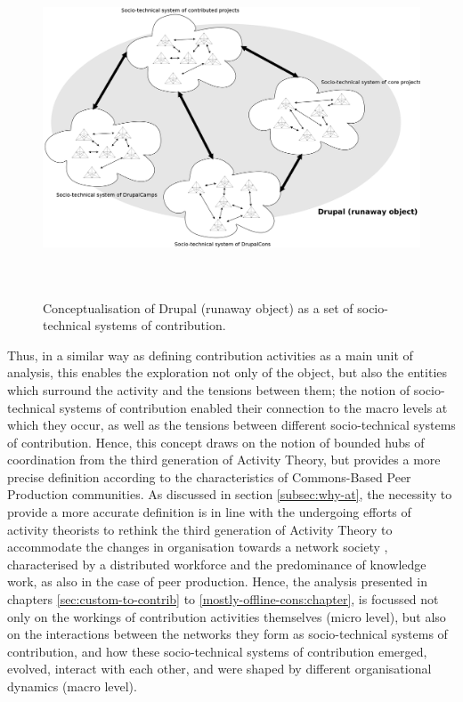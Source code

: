 \begin{figure}[h]
	\centering
	\includegraphics[height=10cm]{diagrams/STSoC.png}
	\caption[Conceptualisation of Drupal as a set of socio-technical systems of contribution]{Conceptualisation of Drupal (runaway object) as a set of socio-technical systems of contribution.}
	\label{STSoC}
\end{figure}

Thus, in a similar way as defining contribution activities as a main unit of analysis, this enables the exploration not only of the object, but also the entities which surround the activity and the tensions between them; the notion of socio-technical systems of contribution enabled their connection to the macro levels at which they occur, as well as the tensions between different socio-technical systems of contribution. Hence, this concept draws on the notion of bounded hubs of coordination from the third generation of Activity Theory, but provides a more precise definition according to the characteristics of Commons-Based Peer Production communities. As discussed in section \ref{subsec:why-at}, the necessity to provide a more accurate definition is in line with the undergoing efforts of activity theorists to rethink the third generation of Activity Theory to accommodate the changes in organisation towards a network society \parencite{castells2011rise}, characterised by a distributed workforce and the predominance of knowledge work, as also in the case of peer production. Hence, the analysis presented in chapters \ref{sec:custom-to-contrib} to \ref{mostly-offline-cons:chapter}, is focussed not only on the workings of contribution activities themselves (micro level), but also on the interactions between the networks they form as socio-technical systems of contribution, and how these socio-technical systems of contribution emerged, evolved, interact with each other, and were shaped by different organisational dynamics (macro level).


